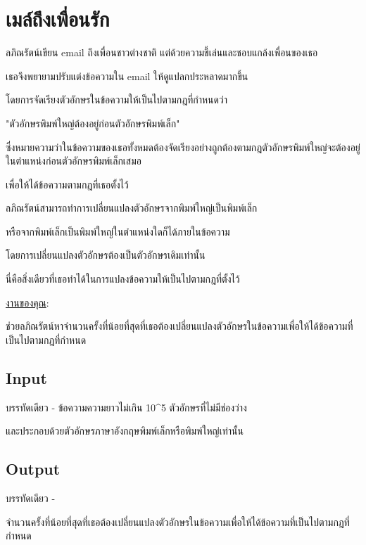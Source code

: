 \documentclass{article}
\begin{document}
\section*{เมล์ถึงเพื่อนรัก}

ลภิณรัตน์เขียน email ถึงเพื่อนชาวต่างชาติ แต่ด้วยความขี้เล่นและชอบแกล้งเพื่อนของเธอ

เธอจึงพยายามปรับแต่งข้อความใน email ให้ดูแปลกประหลาดมากขึ้น

โดยการจัดเรียงตัวอักษรในข้อความให้เป็นไปตามกฎที่กำหนดว่า

"ตัวอักษรพิมพ์ใหญ่ต้องอยู่ก่อนตัวอักษรพิมพ์เล็ก"

ซึ่งหมายความว่าในข้อความของเธอทั้งหมดต้องจัดเรียงอย่างถูกต้องตามกฎตัวอักษรพิมพ์ใหญ่จะต้องอยู่ในตำแหน่งก่อนตัวอักษรพิมพ์เล็กเสมอ



เพื่อให้ได้ข้อความตามกฎที่เธอตั้งไว้

ลภิณรัตน์สามารถทำการเปลี่ยนแปลงตัวอักษรจากพิมพ์ใหญ่เป็นพิมพ์เล็ก

หรือจากพิมพ์เล็กเป็นพิมพ์ใหญ่ในตำแหน่งใดก็ได้ภายในข้อความ

โดยการเปลี่ยนแปลงตัวอักษรต้องเป็นตัวอักษรเดิมเท่านั้น

นี่คือสิ่งเดียวที่เธอทำได้ในการแปลงข้อความให้เป็นไปตามกฎที่ตั้งไว้



\ul{งานของคุณ}:

ช่วยลภิณรัตน์หาจำนวนครั้งที่น้อยที่สุดที่เธอต้องเปลี่ยนแปลงตัวอักษรในข้อความเพื่อให้ได้ข้อความที่เป็นไปตามกฎที่กำหนด



\subsection*{Input}
บรรทัดเดียว - ข้อความความยาวไม่เกิน 10\^{}5 ตัวอักษรที่ไม่มีช่องว่าง

และประกอบด้วยตัวอักษรภาษาอังกฤษพิมพ์เล็กหรือพิมพ์ใหญ่เท่านั้น\\



\subsection*{Output}
บรรทัดเดียว -

จำนวนครั้งที่น้อยที่สุดที่เธอต้องเปลี่ยนแปลงตัวอักษรในข้อความเพื่อให้ได้ข้อความที่เป็นไปตามกฎที่กำหนด\\
\end{document}
